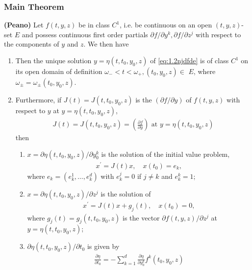 \documentclass{article}
\newcommand{\bfs}[1]{\textbf{({#1}) }}
\begin{document}
\subsubsection{Main Theorem}
\begin{thma}\bfs{Peano}\label{thm:Peanodiff}
 Let $f(t, y, z)$ be in class $C^1$, i.e. be continuous on an open $(t, y, z)$-set $E$ and possess continuous first order partials $\partial f / \partial y^{k}, \partial f / \partial z^{j}$ with respect to the components of $y$ and $z$. We then have 
 \begin{enumerate}[1)]
     \item  Then the unique solution $y=\eta\left(t, t_{0}, y_{0}, z\right)$ of \cref{eq:1.2njdfde} is of class $C^{1}$ on its open domain of definition $\omega_{-}<t<\omega_{+},\left(t_{0}, y_{0}, z\right) \in$ $E$, where $\omega_{\pm}=\omega_{\pm}\left(t_{0}, y_{0}, z\right)$.
     \item Furthermore, if $J(t)=J\left(t, t_{0}, y_{0}, z\right)$ is the  $(\partial f / \partial y)$ of $f(t, y, z)$ with respect to $y$ at $y=\eta\left(t, t_{0}, y_{0}, z\right)$,
\begin{align}
    J(t)=J\left(t, t_{0}, y_{0}, z\right)=\left(\frac{\partial f}{\partial y}\right) \text{ at }y=\eta\left(t, t_{0}, y_{0}, z\right)\label{eq:3.1vsda}
\end{align}
then 
\begin{enumerate}
    \item $x=\partial \eta\left(t, t_{0}, y_{0}, z\right) / \partial y_{0}^{k}$ is the solution of the initial value problem,
\begin{align}
x^{\prime}=J(t) x, \quad x\left(t_{0}\right)=e_{k},\label{eq:3.2mdca}
\end{align}
where $e_{k}=\left(e_{k}^{1}, \ldots, e_{k}^{d}\right)$ with $e_{k}^{j}=0$ if $j \neq k$ and $e_{k}^{k}=1$;
\item $x=\partial \eta\left(t, t_{0}, y_{0}, z\right) / \partial z^{j}$ is the solution of
\begin{align}
x^{\prime}=J(t) x+g_{j}(t), \quad x\left(t_{0}\right)=0,\label{eq:3.3cvsa}
\end{align}
where $g_{j}(t)=g_{j}\left(t, t_{0}, y_{0}, z\right)$ is the vector $\partial f(t, y, z) / \partial z^{j}$ at $y=\eta\left(t, t_{0}, y_{0}, z\right)$;
\item $\partial \eta\left(t, t_{0}, y_{0}, z\right) / \partial t_{0}$ is given by
\begin{align}
\frac{\partial \eta}{\partial t_{0}}=-\sum_{k=1}^{d} \frac{\partial \eta}{\partial y_{0}^{k}} f^{k}\left(t_{0}, y_{0}, z\right)\label{eq:3.4dcczx}
\end{align}
\end{enumerate}
 \end{enumerate} 
\end{thma}
\end{document}
